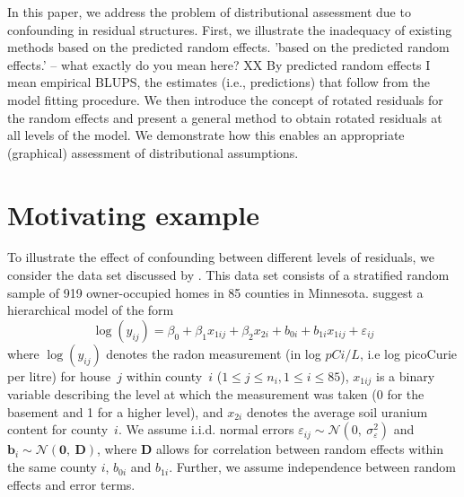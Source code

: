 \documentclass[12pt]{article} %
\newcommand{\hh}[1]{{\color{orange} #1}}
\newcommand{\al}[1]{{\color{red} #1}}
\begin{document}
In this paper, we address the problem of distributional assessment due to confounding in residual structures. 
First, we illustrate the inadequacy of existing methods based on the predicted random effects. \hh{'based on the predicted random effects.' -- what exactly do you mean here?} \al{ XX By predicted random effects I mean empirical BLUPS, the estimates (i.e., predictions) that follow from the model fitting procedure.}
We then introduce  the concept of \al{rotated} residuals for the random effects and present a general method to obtain \al{rotated} residuals at all levels of the model. We demonstrate how this enables an appropriate (graphical) assessment  of distributional assumptions. %


\section{Motivating example}\label{sec:ex}
To illustrate the effect of confounding between different levels of residuals, we consider the data set discussed by
 \cite{Gelman:2006ue}. This data set consists of a stratified random sample of 919 owner-occupied homes in 85 counties in Minnesota.  \cite{Gelman:2006ue}  suggest a hierarchical model of the form
%
\begin{equation}\label{eq:radon}
  \log(y_{ij}) = \beta_0 + \beta_1 x_{1ij} + \beta_2 x_{2i} + b_{0i} + b_{1i} x_{1ij}  + \varepsilon_{ij}
\end{equation}
%
where   $\log(y_{ij})$ denotes the  radon measurement (in log $pCi/L$, i.e log picoCurie per litre) for house~$j$ within county~$i$ ($1 \le j \le n_i, 1 \le i \le 85$),
 $x_{1ij}$ is a binary variable describing the level at which the measurement was taken (0 for the basement and 1 for a higher level), and $x_{2i}$ denotes the average soil uranium content for  county~$i$. 
 We assume i.i.d. normal errors $\varepsilon_{ij} \sim \mathcal{N} (0,\ \sigma^2_{\varepsilon})$  and $\bm{b}_i \sim \mathcal{N}(\bm{0},\ \bm{D})$, where $\bm{D}$ allows for correlation between \hh{random effects within the same county $i$}, $b_{0i}$ and $b_{1i}$. Further, we assume independence between random effects and error \al{terms}. 
\end{document}
